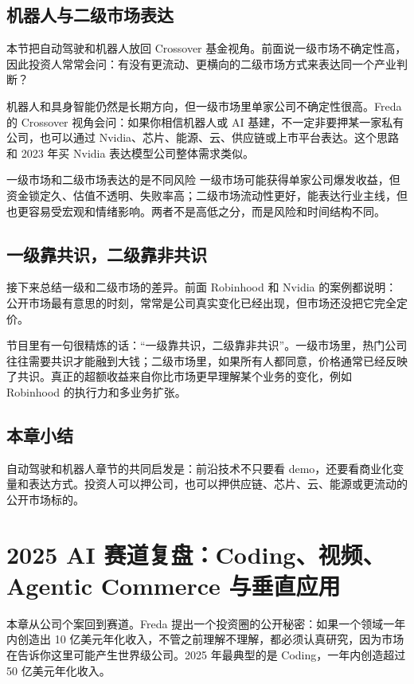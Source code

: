 \documentclass[a4paper]{article}
\begin{document}
\subsection{机器人与二级市场表达}

本节把自动驾驶和机器人放回 Crossover 基金视角。前面说一级市场不确定性高，因此投资人常常会问：有没有更流动、更横向的二级市场方式来表达同一个产业判断？

机器人和具身智能仍然是长期方向，但一级市场里单家公司不确定性很高。Freda 的 Crossover 视角会问：如果你相信机器人或 AI 基建，不一定非要押某一家私有公司，也可以通过 Nvidia、芯片、能源、云、供应链或上市平台表达。这个思路和 2023 年买 Nvidia 表达模型公司整体需求类似。

\begin{warningbox}{一级市场和二级市场表达的是不同风险}
一级市场可能获得单家公司爆发收益，但资金锁定久、估值不透明、失败率高；二级市场流动性更好，能表达行业主线，但也更容易受宏观和情绪影响。两者不是高低之分，而是风险和时间结构不同。
\end{warningbox}

\subsection{一级靠共识，二级靠非共识}

接下来总结一级和二级市场的差异。前面 Robinhood 和 Nvidia 的案例都说明：公开市场最有意思的时刻，常常是公司真实变化已经出现，但市场还没把它完全定价。

节目里有一句很精炼的话：“一级靠共识，二级靠非共识”。一级市场里，热门公司往往需要共识才能融到大钱；二级市场里，如果所有人都同意，价格通常已经反映了共识。真正的超额收益来自你比市场更早理解某个业务的变化，例如 Robinhood 的执行力和多业务扩张。

\subsection{本章小结}

自动驾驶和机器人章节的共同启发是：前沿技术不只要看 demo，还要看商业化变量和表达方式。投资人可以押公司，也可以押供应链、芯片、云、能源或更流动的公开市场标的。

\section{2025 AI 赛道复盘：Coding、视频、Agentic Commerce 与垂直应用}

本章从公司个案回到赛道。Freda 提出一个投资圈的公开秘密：如果一个领域一年内创造出 10 亿美元年化收入，不管之前理解不理解，都必须认真研究，因为市场在告诉你这里可能产生世界级公司。2025 年最典型的是 Coding，一年内创造超过 50 亿美元年化收入。
\end{document}
